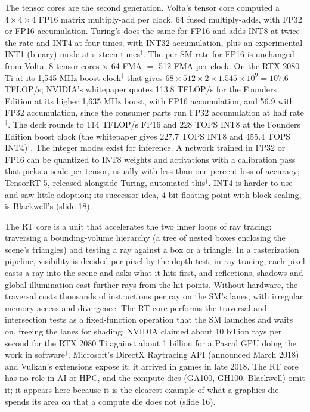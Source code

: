 \documentclass[11pt,letterpaper]{article}
\begin{document}
The tensor cores are the second generation. Volta's tensor core computed a $4\times4\times4$ FP16 matrix multiply-add per clock, 64 fused multiply-adds, with FP32 or FP16 accumulation. Turing's does the same for FP16 and adds INT8 at twice the rate and INT4 at four times, with INT32 accumulation, plus an experimental INT1 (binary) mode at sixteen times$^\dagger$. The per-SM rate for FP16 is unchanged from Volta: 8 tensor cores $\times$ 64 FMA $=$ 512 FMA per clock. On the RTX 2080 Ti at its 1,545 MHz boost clock$^\dagger$ that gives $68 \times 512 \times 2 \times 1.545 \times 10^9 = 107.6$ TFLOP/s; NVIDIA's whitepaper quotes 113.8 TFLOP/s for the Founders Edition at its higher 1,635 MHz boost, with FP16 accumulation, and 56.9 with FP32 accumulation, since the consumer parts run FP32 accumulation at half rate$^\dagger$. The deck rounds to 114 TFLOP/s FP16 and 228 TOPS INT8 at the Founders Edition boost clock (the whitepaper gives 227.7 TOPS INT8 and 455.4 TOPS INT4)$^\dagger$. The integer modes exist for inference. A network trained in FP32 or FP16 can be quantized to INT8 weights and activations with a calibration pass that picks a scale per tensor, usually with less than one percent loss of accuracy; TensorRT 5, released alongside Turing, automated this$^\dagger$. INT4 is harder to use and saw little adoption; its successor idea, 4-bit floating point with block scaling, is Blackwell's (slide 18).

The RT core is a unit that accelerates the two inner loops of ray tracing: traversing a bounding-volume hierarchy (a tree of nested boxes enclosing the scene's triangles) and testing a ray against a box or a triangle. In a rasterization pipeline, visibility is decided per pixel by the depth test; in ray tracing, each pixel casts a ray into the scene and asks what it hits first, and reflections, shadows and global illumination cast further rays from the hit points. Without hardware, the traversal costs thousands of instructions per ray on the SM's lanes, with irregular memory access and divergence. The RT core performs the traversal and intersection tests as a fixed-function operation that the SM launches and waits on, freeing the lanes for shading; NVIDIA claimed about 10 billion rays per second for the RTX 2080 Ti against about 1 billion for a Pascal GPU doing the work in software$^\dagger$. Microsoft's DirectX Raytracing API (announced March 2018) and Vulkan's extensions expose it; it arrived in games in late 2018. The RT core has no role in AI or HPC, and the compute dies (GA100, GH100, Blackwell) omit it; it appears here because it is the clearest example of what a graphics die spends its area on that a compute die does not (slide 16).
\end{document}

